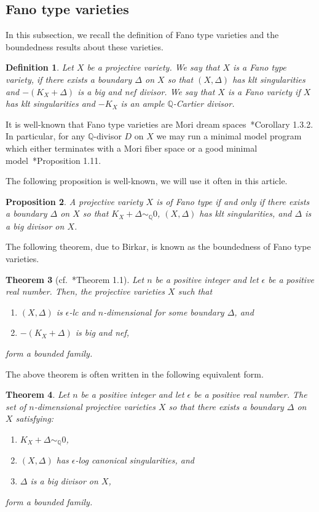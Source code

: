 \documentclass{amsart}
\renewcommand{\qq}{\mathbb{Q}}
\newtheorem{theorem}{Theorem}[section]
\newtheorem{proposition}[theorem]{Proposition}
\newtheorem{definition}[theorem]{Definition}
\theoremstyle{remark}
\numberwithin{equation}{section}
\begin{document}
\subsection{Fano type varieties}\label{subsec:ft-var}
In this subsection, we recall the definition of Fano type varieties and the boundedness results about these varieties.

\begin{definition}{\em 
Let $X$ be a projective variety.
We say that $X$ is a {\em Fano type variety},
if there exists a boundary $\Delta$ on $X$ 
so that $(X,\Delta)$ has klt singularities
and $-(K_X+\Delta)$ is a big and nef divisor.
We say that $X$ is a {\em Fano variety}
if $X$ has klt singularities
and $-K_X$ is an ample $\qq$-Cartier divisor.
}
\end{definition}

It is well-known that Fano type varieties
are Mori dream spaces~\cite{BCHM10}*{Corollary 1.3.2}.
In particular, for any $\qq$-divisor $D$ on $X$
we may run a minimal model program 
which either terminates with a Mori fiber space
or a good minimal model~\cite{HK00}*{Proposition 1.11}.

The following proposition is well-known, we will use it often in this article.

\begin{proposition}
A projective variety $X$ is of Fano type if and only if 
there exists a boundary $\Delta$ on $X$ so that $K_X+\Delta\sim_\qq 0$,
$(X,\Delta)$ has klt singularities, and
$\Delta$ is a big divisor on $X$.
\end{proposition}

The following theorem, due to Birkar, is known as the boundedness of Fano type varieties.

\begin{theorem}[cf.~\cite{Bir16b}*{Theorem 1.1}]
Let $n$ be a positive integer and let $\epsilon$ be a positive real number.
Then, the projective varieties $X$ such that
\begin{enumerate}
\item $(X,\Delta)$ is $\epsilon$-lc and $n$-dimensional for some boundary $\Delta$, and  
\item  $-(K_X+\Delta)$ is big and nef,
\end{enumerate}
form a bounded family.
\end{theorem} 

The above theorem is often written in the following equivalent form.

\begin{theorem} 
Let $n$ be a positive integer and let $\epsilon$ be a positive real number.
The set of $n$-dimensional projective varieties $X$ so that there exists a boundary $\Delta$ on $X$ satisfying:
\begin{enumerate}
\item $K_X+\Delta\sim_\qq 0$, 
\item $(X,\Delta)$ has $\epsilon$-log canonical singularities, and
\item $\Delta$ is a big divisor on $X$,
\end{enumerate}
form a bounded family.
\end{theorem} 
\end{document}
